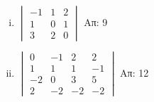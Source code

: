 \begin{enumerate}
\begin{enumerate}[i),itemsep=10pt]
    \item $\begin{vmatrix}
            -1 & 1 & 2 \\
            1 & 0 & 1 \\
            3 & 2 & 0 
        \end{vmatrix}$
    \hfill Απ: 9 

\item $\begin{vmatrix}
        0 & -1 & 2 & 2 \\
        1 & 1 & 1 & -1 \\
        -2 & 0 & 3 & 5 \\
        2 & -2 & -2 & -2
    \end{vmatrix}$
\hfill Απ: 12  

\end{enumerate}

\end{enumerate}



